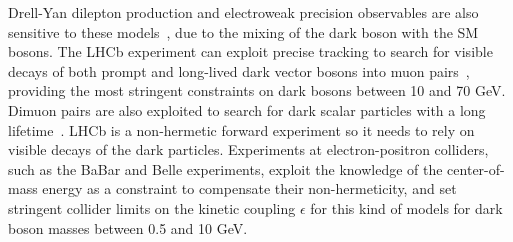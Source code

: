 Drell-Yan dilepton production
and electroweak precision observables are also sensitive to these models~\cite{Curtin:2014cca},
due to the mixing of the dark boson with the SM bosons. 
The LHCb experiment can exploit precise tracking 
to search for visible decays of both prompt and long-lived dark vector bosons into muon pairs~\cite{Aaij:2017rft},
providing the most stringent constraints on dark bosons between 10 and 70 GeV. Dimuon pairs are 
also exploited to search for dark scalar particles with a long lifetime~\cite{Aaij:2016qsm}. %
LHCb is a non-hermetic forward experiment so it needs to rely on visible decays of the dark particles. 
Experiments at electron-positron colliders, such as the BaBar and Belle experiments,
exploit the knowledge of the center-of-mass energy as a constraint to compensate their non-hermeticity, 
and set stringent collider limits on the kinetic coupling $\epsilon$ for this kind of models
for dark boson masses between 0.5 and 10 GeV. 



%
%
%
%
%


%
%
%
%
%


